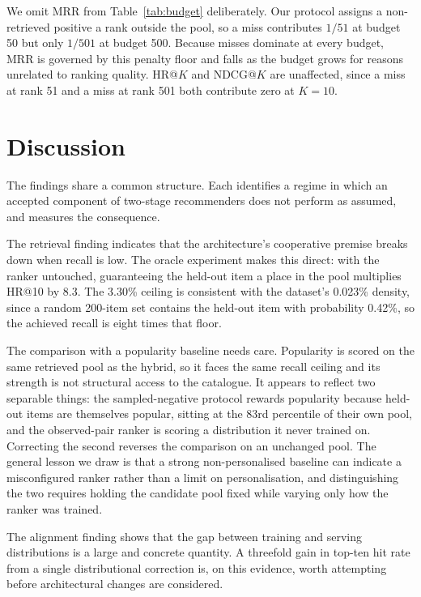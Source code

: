 \documentclass[10pt,twocolumn]{article}
\begin{document}
We omit MRR from Table~\ref{tab:budget} deliberately. Our protocol assigns a
non-retrieved positive a rank outside the pool, so a miss contributes $1/51$
at budget 50 but only $1/501$ at budget 500. Because misses dominate at every
budget, MRR is governed by this penalty floor and falls as the budget grows for
reasons unrelated to ranking quality. HR@$K$ and NDCG@$K$ are unaffected,
since a miss at rank 51 and a miss at rank 501 both contribute zero at $K=10$.

\section{Discussion}
\label{sec:discussion}

The findings share a common structure. Each identifies a regime in which an
accepted component of two-stage recommenders does not perform as assumed, and
measures the consequence.

The retrieval finding indicates that the architecture's cooperative premise
breaks down when recall is low. The oracle experiment makes this direct: with
the ranker untouched, guaranteeing the held-out item a place in the pool
multiplies HR@10 by 8.3. The 3.30\% ceiling is consistent with the dataset's
0.023\% density, since a random 200-item set contains the held-out item with
probability 0.42\%, so the achieved recall is eight times that floor.

The comparison with a popularity baseline needs care. Popularity is scored on
the same retrieved pool as the hybrid, so it faces the same recall ceiling and
its strength is not structural access to the catalogue. It appears to reflect
two separable things: the sampled-negative protocol rewards popularity because
held-out items are themselves popular, sitting at the 83rd percentile of their
own pool, and the observed-pair ranker is scoring a distribution it never
trained on. Correcting the second reverses the comparison on an unchanged
pool. The general lesson we draw is that a strong non-personalised baseline
can indicate a misconfigured ranker rather than a limit on personalisation,
and distinguishing the two requires holding the candidate pool fixed while
varying only how the ranker was trained.

The alignment finding shows that the gap between training and serving
distributions is a large and concrete quantity. A threefold gain in top-ten
hit rate from a single distributional correction is, on this evidence, worth
attempting before architectural changes are considered.
\end{document}
